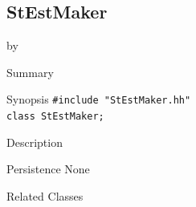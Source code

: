 \documentclass[twoside]{article}
\newcommand{\entrylabel}[1]{\mbox{\textbf{{#1}}}\hfil}%
\newenvironment{entry}
{\begin{list}{}%
    {\renewcommand{\makelabel}{\entrylabel}%
     \setlength{\labelwidth}{90pt}%
     \setlength{\leftmargin}{\labelwidth}
     \advance\leftmargin by \labelsep%
      }%
    }%
  {\end{list}}
\newcommand{\Entrylabel}[1]%
{\raisebox{0pt}[1ex][0pt]{\makebox[\labelwidth][l]%
    {\parbox[t]{\labelwidth}{\hspace{0pt}\textbf{{#1}}}}}}
\newenvironment{Entry}%
{\renewcommand{\entrylabel}{\Entrylabel}\begin{entry}}%
  {\end{entry}}
\begin{document}
\subsection{StEstMaker}
\label{sec:StestMakerq}
\begin{Entry}
\item[Summary]

\item[Synopsis]
    \verb+#include "StEstMaker.hh"+\\ \verb+class StEstMaker;+\\

\item[Description]

\item[Persistence]
    None

\item[Related Classes]


\end{Entry}
\end{document}
